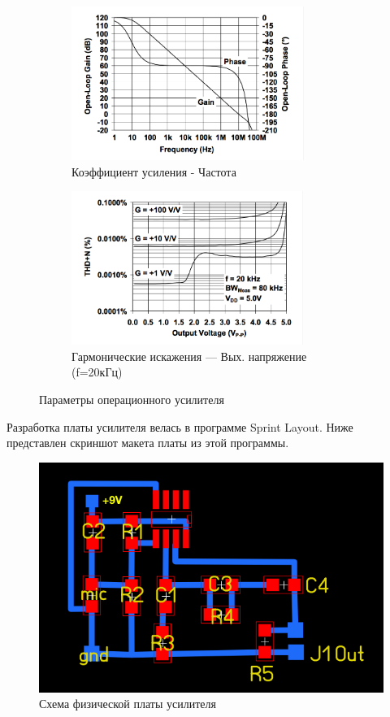 \begin{figure}[H]
\vspace{10mm} %

\begin{subfigure}{0.5\textwidth}
\includegraphics[width=0.9\linewidth, height=5cm]{op-amp-plot5.png} 
\caption{Коэффициент усиления - Частота}
\end{subfigure}
\begin{subfigure}{0.5\textwidth}
\includegraphics[width=0.9\linewidth, height=5cm]{op-amp-plot6.png}
\caption{\small{Гармонические искажения --- Вых. напряжение (f=20кГц)}}
\end{subfigure}

\caption{Параметры операционного усилителя}
\label{fig:image2}
\end{figure}

Разработка платы усилителя велась в программе Sprint Layout. Ниже представлен скриншот макета платы из этой программы.

\begin{figure}[H]
\centering
\includegraphics[width=\textwidth]{sprint-layout-circuit.png}
\caption{Схема физической платы усилителя}
\end{figure}

